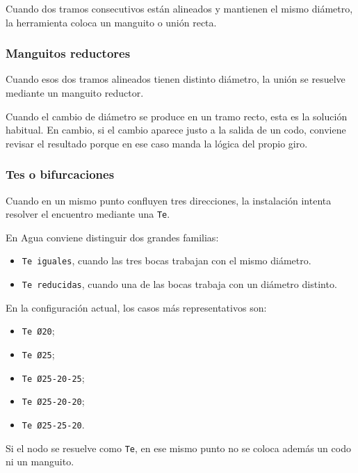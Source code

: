 \documentclass[12pt,a4paper]{article}
\begin{document}
Cuando dos tramos consecutivos están alineados y mantienen el mismo diámetro, la herramienta coloca un manguito o unión recta.

\subsubsection{Manguitos reductores}

Cuando esos dos tramos alineados tienen distinto diámetro, la unión se resuelve mediante un manguito reductor.

Cuando el cambio de diámetro se produce en un tramo recto, esta es la solución habitual. En cambio, si el cambio aparece justo a la salida de un codo, conviene revisar el resultado porque en ese caso manda la lógica del propio giro.

\subsubsection{Tes o bifurcaciones}

Cuando en un mismo punto confluyen tres direcciones, la instalación intenta resolver el encuentro mediante una \texttt{Te}.

En Agua conviene distinguir dos grandes familias:

\begin{itemize}
\item \texttt{Te iguales}, cuando las tres bocas trabajan con el mismo diámetro.
\item \texttt{Te reducidas}, cuando una de las bocas trabaja con un diámetro distinto.
\end{itemize}

En la configuración actual, los casos más representativos son:

\begin{itemize}
\item \texttt{Te Ø20};
\item \texttt{Te Ø25};
\item \texttt{Te Ø25-20-25};
\item \texttt{Te Ø25-20-20};
\item \texttt{Te Ø25-25-20}.
\end{itemize}

Si el nodo se resuelve como \texttt{Te}, en ese mismo punto no se coloca además un codo ni un manguito.
\end{document}
